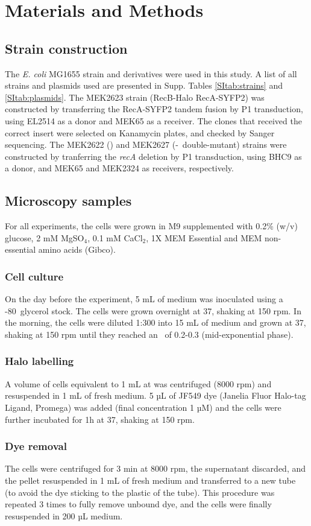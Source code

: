 \section*{Materials and Methods}

\subsection*{Strain construction}
The \textit{E. coli} MG1655 strain and derivatives were used in this study. A list of all strains and plasmids used are presented in Supp. Tables \ref{SItab:strains} and \ref{SItab:plasmids}.
The MEK2623 strain (RecB-Halo RecA-SYFP2) was constructed by transferring the RecA-SYFP2 tandem fusion by P1 transduction, using EL2514\cite{Wiktor2021} as a donor and MEK65\cite{Lepore2019a} as a receiver. The clones that received the correct insert were selected on Kanamycin plates, and checked by Sanger sequencing. The MEK2622 (\dreca) and MEK2627 (\teneighty -\dreca\ double-mutant) strains  were constructed by tranferring the \textit{recA} deletion by P1 transduction, using BHC9 as a donor, and MEK65 and MEK2324 as receivers, respectively.

\subsection*{Microscopy samples}
For all experiments, the cells were grown in M9 supplemented with 0.2\% (w/v) glucose, 2 mM MgSO$_4$, 0.1 mM CaCl$_2$, 1X MEM Essential and MEM non-essential amino acids (Gibco).
\subsubsection*{Cell culture}
On the day before the experiment, 5 mL of medium was inoculated using a -80\celsius\ glycerol stock. The cells were grown overnight at 37\celsius, shaking at 150 rpm. In the morning, the cells were diluted 1:300 into 15 mL of medium and grown at 37\celsius, shaking at 150 rpm until they reached an \od\ of 0.2-0.3 (mid-exponential phase).
\subsubsection*{Halo labelling}
A volume of cells equivalent to 1 mL at  was centrifuged (8000 rpm) and resuspended in 1 mL of fresh medium. 5 µL of JF549 dye (Janelia Fluor Halo-tag Ligand, Promega) was added (final concentration 1 µM) and the cells were further incubated for 1h at 37\celsius, shaking at 150 rpm.
\subsubsection*{Dye removal}
The cells were centrifuged for 3 min at 8000 rpm, the supernatant discarded, and the pellet resuspended in 1 mL of fresh medium and transferred to a new tube (to avoid the dye sticking to the plastic of the tube). This procedure was repeated 3 times to fully remove unbound dye, and the cells were finally resuspended in 200 µL medium.
